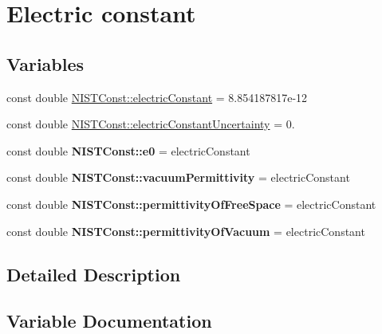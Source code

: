 \hypertarget{group___electric_constant}{}\section{Electric constant}
\label{group___electric_constant}
\subsection*{Variables}
\begin{DoxyCompactItemize}
\item 
const double \hyperlink{group___electric_constant_gae5a425228125285727dd53333725ef76}{N\+I\+S\+T\+Const\+::electric\+Constant} = 8.\+854187817e-\/12
\item 
const double \hyperlink{group___electric_constant_gaf65e89a9fe674a6f80f5a66bbe101aab}{N\+I\+S\+T\+Const\+::electric\+Constant\+Uncertainty} = 0.
\item 
\mbox{\label{group___electric_constant_ga6fa2aaf171b8dafe96bbd87c7aa95f59}} 
const double {\bfseries N\+I\+S\+T\+Const\+::e0} = electric\+Constant
\item 
\mbox{\label{group___electric_constant_ga46294f940b4149602e7bef336431c7dd}} 
const double {\bfseries N\+I\+S\+T\+Const\+::vacuum\+Permittivity} = electric\+Constant
\item 
\mbox{\label{group___electric_constant_ga56d0b5b81201a3a81b724d45a4a73b81}} 
const double {\bfseries N\+I\+S\+T\+Const\+::permittivity\+Of\+Free\+Space} = electric\+Constant
\item 
\mbox{\label{group___electric_constant_ga81378e87b977f5b3403002e187d3d22c}} 
const double {\bfseries N\+I\+S\+T\+Const\+::permittivity\+Of\+Vacuum} = electric\+Constant
\end{DoxyCompactItemize}


\subsection{Detailed Description}


\subsection{Variable Documentation}
\mbox{\label{group___electric_constant_gae5a425228125285727dd53333725ef76}} 
